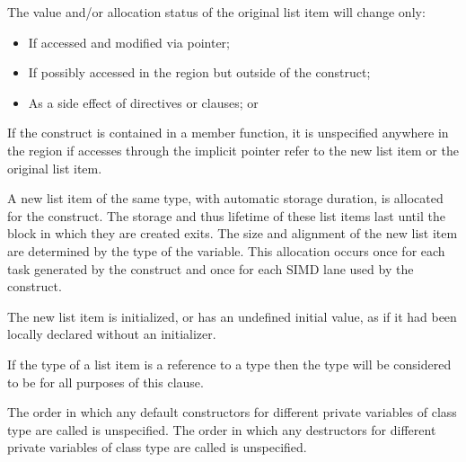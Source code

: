 The value and/or allocation status of the original list item will change only:

\begin{itemize}
\item If accessed and modified via pointer;
\item If possibly accessed in the region but outside of the construct;
\item As a side effect of directives or clauses; or

\end{itemize}

\begin{cppspecific}
If the construct is contained in a member function, it is unspecified
anywhere in the region if accesses through the implicit 
pointer refer to the new list item or the original list item.
\end{cppspecific}

\begin{ccppspecific}
A new list item of the same type, with automatic storage duration, is allocated 
for the construct. The storage and thus lifetime of these list items last until 
the block in which they are created exits. The size and alignment of the new list 
item are determined by the type of the variable. This allocation occurs once for 
each task generated by the construct and once for each SIMD lane used by the construct.

The new list item is initialized, or has an undefined initial value, as if it 
had been locally declared without an initializer.
\end{ccppspecific}

\begin{cppspecific}
If the type of a list item is a reference to a type  then the type will 
be considered to be  for all purposes of this clause.

The order in which any default constructors for different private variables of 
class type are called is unspecified. The order in which any destructors for 
different private variables of class type are called is unspecified.
\end{cppspecific}

